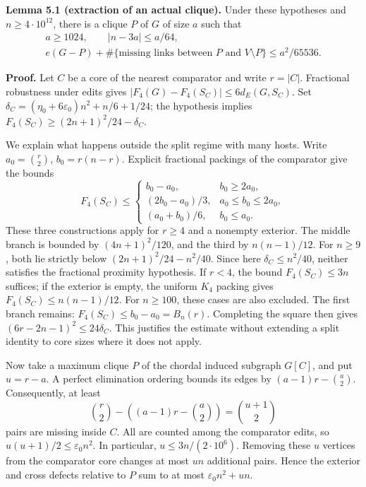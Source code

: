 \documentclass[english,11pt,a4paper]{article}
\newcounter{none}
\begin{document}

\textbf{Lemma 5.1 (extraction of an actual clique).} Under these hypotheses and \(n\ge4\cdot10^{12}\), there is a clique \(P\) of \(G\) of size \(a\) such that \[
\begin{gathered}
a\ge1024,\qquad |n-3a|\le a/64,\\
e(G-P)+\#\{\text{missing links between }P\text{ and }V\setminus P\}
\le a^2/65536.
\end{gathered}
\tag{5.1}
\]

\textbf{Proof.} Let \(C\) be a core of the nearest comparator and write \(r=|C|\). Fractional robustness under edits gives \(|F_4(G)-F_4(S_C)|\le6d_E(G,S_C)\). Set \(\delta_C=(\eta_0+6\varepsilon_0)n^2+n/6+1/24\); the hypothesis implies \(F_4(S_C)\ge(2n+1)^2/24-\delta_C\).

We explain what happens outside the split regime with many hosts. Write \(a_0=\binom r2\), \(b_0=r(n-r)\). Explicit fractional packings of the comparator give the bounds \[
F_4(S_C)\le
\begin{cases}
b_0-a_0,&b_0\ge2a_0,\\
(2b_0-a_0)/3,&a_0\le b_0\le2a_0,\\
(a_0+b_0)/6,&b_0\le a_0.
\end{cases}
\tag{5.1a}
\] These three constructions apply for \(r\ge4\) and a nonempty exterior. The middle branch is bounded by \((4n+1)^2/120\), and the third by \(n(n-1)/12\). For \(n\ge9\), both lie strictly below \((2n+1)^2/24-n^2/40\). Since here \(\delta_C\le n^2/40\), neither satisfies the fractional proximity hypothesis. If \(r<4\), the bound \(F_4(S_C)\le3n\) suffices; if the exterior is empty, the uniform \(K_4\) packing gives \(F_4(S_C)\le n(n-1)/12\). For \(n\ge100\), these cases are also excluded. The first branch remains: \(F_4(S_C)\le b_0-a_0=B_n(r)\). Completing the square then gives \((6r-2n-1)^2\le24\delta_C\). This justifies the estimate without extending a split identity to core sizes where it does not apply.

Now take a maximum clique \(P\) of the chordal induced subgraph \(G[C]\), and put \(u=r-a\). A perfect elimination ordering bounds its edges by \((a-1)r-\binom a2\). Consequently, at least \[
\binom r2-\left((a-1)r-\binom a2\right)
=\binom{u+1}{2}
\] pairs are missing inside \(C\). All are counted among the comparator edits, so \(u(u+1)/2\le\varepsilon_0n^2\). In particular, \(u\le3n/(2\cdot10^6)\). Removing these \(u\) vertices from the comparator core changes at most \(un\) additional pairs. Hence the exterior and cross defects relative to \(P\) sum to at most \(\varepsilon_0n^2+un\).
\end{document}
